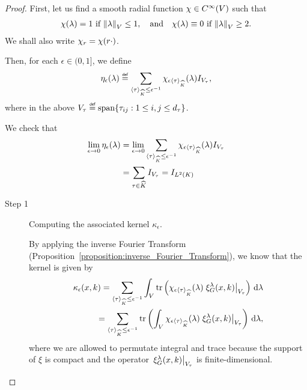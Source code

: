 \begin{proof}
    First, let us find a smooth radial function $\chi \in {C^\infty(V)}$ such that
    \begin{align*}
        \chi(\lambda) = 1 \  \text{if}\  \norm[\VectorSpace]{\lambda} \leq 1, \quad \text{and} \quad
        \chi(\lambda) \equiv 0 \ \text{if}\  \norm[\VectorSpace]{\lambda} \geq 2.
    \end{align*}
    We shall also write $\chi_r = \chi(r \cdot)$.

    Then, for each $\epsilon \in (0, 1]$,
    we define
    \begin{align*}
        \eta_\epsilon(\lambda)
        \defeq \sum_{\JapaneseBracket \CompactGroup \tau \leq \epsilon^{-1}} \chi_{\epsilon \JapaneseBracket \CompactGroup \tau}(\lambda) \Id {V_\tau},
    \end{align*}
    where in the above $V_\tau \defeq \Span \{\tau_{ij} : 1 \leq i, j \leq \dimRep \tau\}$.

    We check that
    \begin{align*}
        \lim_{\epsilon \to 0} \eta_\epsilon(\lambda)
        &= \lim_{\epsilon \to 0} \sum_{{\langle \tau \rangle}_{{\widehat{K}}} \leq \epsilon^{-1}} \chi_{\epsilon {\langle \tau \rangle}_{{\widehat{K}}}} (\lambda) {I_{V_\tau}}\\
        &= \sum_{\tau \in {\widehat{K}}} {I_{V_\tau}}
        = {I_{{L^{2} (K)}}}
    \end{align*}

    \begin{description}
        \item [Step 1] Computing the associated kernel $\kappa_\epsilon$.

            By applying the inverse Fourier Transform (Proposition~\ref{proposition:inverse_Fourier_Transform}),
            we know that the kernel is given by
            \begin{align}
                \kappa_\epsilon(x, k)
                = \sum_{{\langle \tau \rangle}_{{\widehat{K}}} \leq \epsilon^{-1}}
                \int_V
                \operatorname{tr} \left(\chi_{\epsilon {\langle \tau \rangle}_{{\widehat{K}}}} (\lambda) \left. \xi^{\lambda}_{G}(x, k) \right|_{V_\tau}\right) \,\mathrm{d} \lambda \notag\\
                = \sum_{{\langle \tau \rangle}_{{\widehat{K}}} \leq \epsilon^{-1}}
                \operatorname{tr} \left(\int_V
                \chi_{\epsilon {\langle \tau \rangle}_{{\widehat{K}}}} (\lambda) \left. \xi^{\lambda}_{G}(x, k) \right|_{V_\tau}\right) \,\mathrm{d} \lambda,
                \label{eq:Littlewood-Paley:computing_kernel}
            \end{align}
            where we are allowed to permutate integral and trace because the support of $\xi$ is compact
            and the operator $\left. \xi^{\lambda}_{G}(x, k) \right|_{V_\tau}$ is finite-dimensional.


\end{description}
\end{proof}
